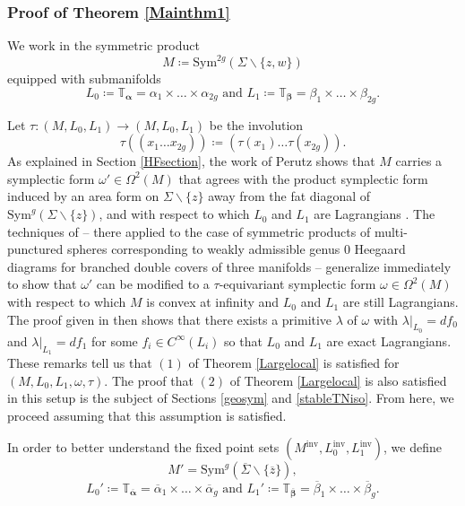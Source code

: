 \documentclass[11pt]{amsart}
\theoremstyle{definition}
\theoremstyle{remark}
\def\Sym{\mathrm{Sym}}
\newcommand{\M}{M^{\operatorname{inv}}}
\newcommand{\Lo}{L_0^{\operatorname{inv}}}
\newcommand{\Li}{L_1^{\operatorname{inv}}}
\numberwithin{equation}{section}
\begin{document}
\subsubsection{Proof of Theorem \ref{Mainthm1}}\label{pfmainthm1}
We work in the symmetric product
\begin{equation}
M\coloneq \Sym^{2g}(\Sigma\backslash\{z,w\})
\end{equation}
equipped with submanifolds
\begin{equation}
L_0\coloneq \mathbb{T}_{\bm{\alpha}}=\alpha_1\times\hdots\times\alpha_{2g}\textrm{ and } L_1\coloneq \mathbb{T}_{\bm{\beta}}=\beta_1\times\hdots\times\beta_{2g}.
\end{equation}

Let $\tau\colon (M,L_0,L_1)\to (M,L_0,L_1)$  be the involution \begin{equation}
    \tau((x_1\hdots x_{2g}))\coloneq (\tau(x_1)\hdots\tau(x_{2g})).
\end{equation}
As explained in Section \ref{HFsection}, the work of Perutz shows that $M$ carries a symplectic form $\omega'\in \Omega^2(M)$ that agrees with the product symplectic form induced by an area form on $\Sigma\backslash\{z\}$ away from the fat diagonal of $\Sym^g(\Sigma\backslash \{z\})$, and with respect to which $L_0$ and $L_1$ are Lagrangians \cite{perutz}. The techniques of \cite[~Section 4]{Hendricks2012rank} -- there applied to the case of symmetric products of multi-punctured spheres corresponding to weakly admissible genus 0 Heegaard diagrams for branched double covers of three manifolds -- generalize immediately to show that $\omega'$ can be modified to a $\tau$-equivariant symplectic form $\omega\in\Omega^2(M)$ with respect to which $M$ is convex at infinity and $L_0$ and $L_1$ are still Lagrangians. The proof given in \cite[~Proposition 4.2]{hendricks2022rank} then shows that there exists a primitive $\lambda$ of $\omega$ with $\lambda|_{L_0}=df_0$ and $\lambda|_{L_1}=df_1$ for some $f_i\in C^\infty(L_i)$ so that $L_0$ and $L_1$ are exact Lagrangians. These remarks tell us that $(1)$ of Theorem \ref{Largelocal} is satisfied for $(M, L_0, L_1, \omega, \tau).$ The proof that $(2)$ of Theorem \ref{Largelocal} is also satisfied in this setup is the subject of Sections \ref{geosym} and \ref{stableTNiso}. From here, we proceed assuming that this assumption is satisfied. 

In order to better understand the fixed point sets $(\M, \Lo, \Li)$, we define 
\begin{equation}\label{M'}
M'=\Sym^g(\overline{\Sigma}\backslash \{\overline{z}\}),
\end{equation}
\begin{equation}\label{L0'L1'}
L_0'\coloneq \mathbb{T}_{\overline{\bm{\alpha}}}=\overline{\alpha}_1\times\hdots\times\overline{\alpha}_g\textrm{ and }
L_1'\coloneq \mathbb{T}_{\overline{\bm{\beta}}}=\overline{\beta}_1\times\hdots\times\overline{\beta}_{g}.
\end{equation}
\end{document}
